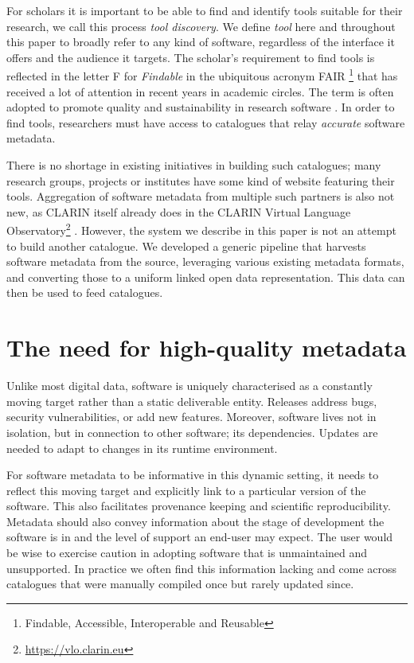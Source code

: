 \documentclass[a4paper,11pt]{article}
\begin{document}
For scholars it is important to be able to find and identify tools suitable for
their research, we call this process \emph{tool discovery}. We define
\emph{tool} here and throughout this paper to broadly refer to any kind of
software, regardless of the interface it offers and the audience it targets.
The scholar's requirement to find tools is reflected in the letter \textsc{F}
for \emph{Findable} in the ubiquitous acronym \textsc{FAIR} \footnote{Findable,
Accessible, Interoperable and Reusable} that has received a lot of attention in
recent years in academic circles. The term is often adopted to promote quality and
sustainability in research software \citep{FAIR}. In order to find tools,
researchers must have access to catalogues that relay \emph{accurate} software
metadata.

There is no shortage in existing initiatives in building such catalogues; 
many research groups, projects or institutes have some kind of website featuring
their tools. Aggregation of software metadata from multiple such partners is
also not new, as CLARIN itself already does in the CLARIN Virtual Language
Observatory\footnote{\url{https://vlo.clarin.eu}} \citep{VLO}.
However, the system we describe in this paper is not an attempt to build another catalogue.
We developed a generic pipeline that harvests software metadata from the source, leveraging
various existing metadata formats, and converting those to a uniform linked open data representation.
This data can then be used to feed catalogues.

\section{The need for high-quality metadata}

Unlike most digital data, software is uniquely characterised as a constantly
moving target rather than a static deliverable entity. Releases address bugs,
security vulnerabilities, or add new features. Moreover, software lives not in
isolation, but in connection to other software; its dependencies. Updates are
needed to adapt to changes in its runtime environment.

For software metadata to be informative in this dynamic setting, it needs to
reflect this moving target and explicitly link to a particular version of the
software. This also facilitates provenance keeping and scientific
reproducibility. Metadata should also convey information about the stage of
development the software is in and the level of support an end-user may expect.
The user would be wise to exercise caution in adopting software that is
unmaintained and unsupported. In practice we often find this information
lacking and come across catalogues that were manually compiled once but rarely
updated since.
\end{document}
